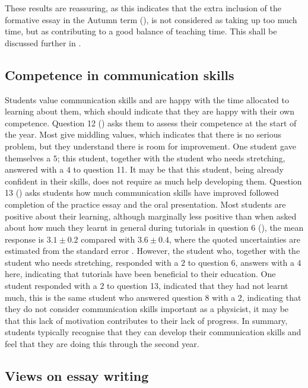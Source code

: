 These results are reassuring, as this indicates that the extra inclusion of the formative essay in the Autumn term (), is not considered as taking up too much time, but as contributing to a good balance of teaching time. This shall be discussed further in .

\subsection{Competence in communication skills}\label{sec:comm-level}

Students value communication skills and are happy with the time allocated to learning about them, which should indicate that they are happy with their own competence. Question 12 () asks them to assess their competence at the start of the year. Most give middling values, which indicates that there is no serious problem, but they understand there is room for improvement. One student gave themselves a $5$; this student, together with the student who needs stretching, answered with a $4$ to question 11. It may be that this student, being already confident in their skills, does not require as much help developing them. Question 13 () asks students how much communication skills have improved followed completion of the practice essay and the oral presentation. Most students are positive about their learning, although marginally less positive than when asked about how much they learnt in general during tutorials in question 6 (), the mean response is $3.1\pm0.2$ compared with $3.6\pm0.4$, where the quoted uncertainties are estimated from the standard error \citep[chapter 22]{Mackay2003}. However, the student who, together with the student who needs stretching, responded with a $2$ to question 6, answers with a $4$ here, indicating that tutorials have been beneficial to their education. One student responded with a $2$ to question 13, indicated that they had not learnt much, this is the same student who answered question 8 with a $2$, indicating that they do not consider communication skills important as a physicist, it may be that this lack of motivation contributes to their lack of progress. In summary, students typically recognise that they can develop their communication skills and feel that they are doing this through the second year.

\subsection{Views on essay writing}\label{sec:essay-results}

